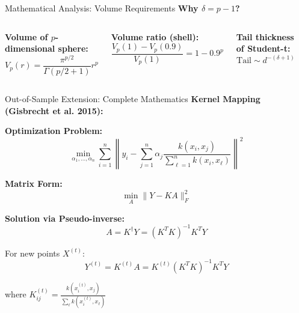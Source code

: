 \begin{frame}{Mathematical Analysis: Volume Requirements}
\textbf{Why $\delta = p - 1$?}

\begin{columns}
\textbf{Volume of $p$-dimensional sphere:}
$$V_p(r) = \frac{\pi^{p/2}}{\Gamma(p/2 + 1)}r^p$$

\textbf{Volume ratio (shell):}
$$\frac{V_p(1) - V_p(0.9)}{V_p(1)} = 1 - 0.9^p$$

\textbf{Tail thickness of Student-t:}
$$\text{Tail} \sim d^{-(\delta+1)}$$

\begin{center}
\end{center}
\end{columns}

\end{frame}

\begin{frame}{Out-of-Sample Extension: Complete Mathematics}
\textbf{Kernel Mapping (Gisbrecht et al. 2015):}

\textbf{Optimization Problem:}
$$\min_{\alpha_1,...,\alpha_n} \sum_{i=1}^n \left\|y_i - \sum_{j=1}^n \alpha_j \frac{k(x_i, x_j)}{\sum_{\ell=1}^n k(x_i, x_\ell)}\right\|^2$$

\textbf{Matrix Form:}
$$\min_A \|Y - KA\|_F^2$$

\textbf{Solution via Pseudo-inverse:}
$$A = K^{\dagger}Y = (K^TK)^{-1}K^TY$$

For new points $X^{(t)}$:
$$Y^{(t)} = K^{(t)}A = K^{(t)}(K^TK)^{-1}K^TY$$

where $K^{(t)}_{ij} = \frac{k(x_i^{(t)}, x_j)}{\sum_\ell k(x_i^{(t)}, x_\ell)}$

\end{frame}

